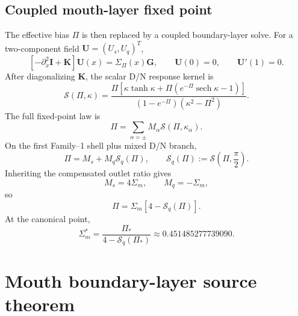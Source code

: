 \subsection{Coupled mouth-layer fixed point}
\label{subsec:app-part04-coupled-mouth-layer-fixed-point}

The effective bias \(\Pi\) is then replaced by a coupled boundary-layer solve.  For a two-component field \(\mathbf U=(U_s,U_q)^T\),
\begin{equation}
\label{eq:app-part04-coupled-mouth-pde}
\left[-\partial_x^2\mathbf I+\mathbf K\right]\mathbf U(x)
=\Sigma_\Pi(x)\mathbf G,
\qquad
\mathbf U(0)=0,
\qquad
\mathbf U'(1)=0.
\end{equation}
After diagonalizing \(\mathbf K\), the scalar D/N response kernel is
\begin{equation}
\label{eq:app-part04-S-kernel}
\mathcal S(\Pi,\kappa)
=
\frac{\Pi\left[\kappa\tanh\kappa+
\Pi\left(e^{-\Pi}\operatorname{sech}\kappa-1\right)\right]}
{(1-e^{-\Pi})(\kappa^2-\Pi^2)}.
\end{equation}
The full fixed-point law is
\begin{equation}
\label{eq:app-part04-general-mouth-fixedpoint}
\Pi=\sum_{\alpha=\pm}M_\alpha\mathcal S(\Pi,\kappa_\alpha).
\end{equation}
On the first Family--1 shell plus mixed D/N branch,
\begin{equation}
\label{eq:app-part04-F1-mouth-fixedpoint}
\Pi=M_s+M_q\mathcal S_q(\Pi),
\qquad
\mathcal S_q(\Pi):=\mathcal S\left(\Pi,\frac{\pi}{2}\right).
\end{equation}
Inheriting the compensated outlet ratio gives
\begin{equation}
\label{eq:app-part04-outlet-consistent-gains}
M_s=4\Sigma_m,
\qquad
M_q=-\Sigma_m,
\end{equation}
so
\begin{equation}
\label{eq:app-part04-one-gain-mouth-law}
\Pi=\Sigma_m\left[4-\mathcal S_q(\Pi)\right].
\end{equation}
At the canonical point,
\begin{equation}
\label{eq:app-part04-Sigmam-star}
\Sigma_m^*=\frac{\Pi_*}{4-\mathcal S_q(\Pi_*)}
\approx0.451485277739090.
\end{equation}

\section{Mouth boundary-layer source theorem}
\label{sec:app-part04_geometry_retarded_mouth:mouth-boundary-layer-source-theorem}

